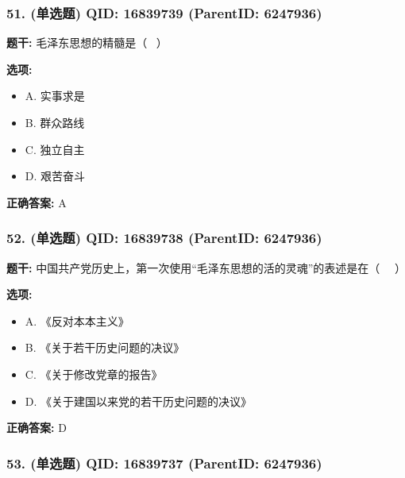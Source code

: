 \documentclass[12pt,UTF8]{ctexart}
\begin{document}
\subsubsection*{51. (单选题) \small QID: 16839739 (ParentID: 6247936)}

\textbf{题干:}
毛泽东思想的精髓是（  ）



\textbf{选项:}
\begin{itemize}[leftmargin=*]

  \item A. 实事求是

  \item B. 群众路线

  \item C. 独立自主

  \item D. 艰苦奋斗

\end{itemize}

\textbf{正确答案:}
A

\vspace{0.3em}\hrulefill\vspace{0.7em}

\subsubsection*{52. (单选题) \small QID: 16839738 (ParentID: 6247936)}

\textbf{题干:}
中国共产党历史上，第一次使用“毛泽东思想的活的灵魂”的表述是在（   ）



\textbf{选项:}
\begin{itemize}[leftmargin=*]

  \item A. 《反对本本主义》

  \item B. 《关于若干历史问题的决议》

  \item C. 《关于修改党章的报告》

  \item D. 《关于建国以来党的若干历史问题的决议》

\end{itemize}

\textbf{正确答案:}
D

\vspace{0.3em}\hrulefill\vspace{0.7em}

\subsubsection*{53. (单选题) \small QID: 16839737 (ParentID: 6247936)}
\end{document}
